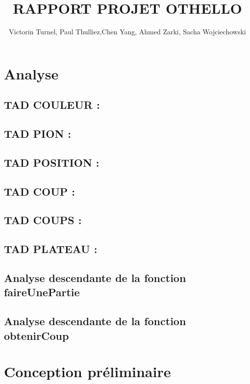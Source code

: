 \documentclass{article}
\title{RAPPORT PROJET OTHELLO}
\author{Victorin Turnel, Paul Thulliez,Chen Yang, Ahmed Zarki, Sacha Wojciechowski}
\begin{document}
\maketitle

\section{Analyse}

\subsection{TAD COULEUR :}


\subsection{TAD PION :}


\subsection{TAD POSITION :}


\subsection{TAD COUP :}


\subsection{TAD COUPS :}


\subsection{TAD PLATEAU :}



\subsection{Analyse descendante de la fonction faireUnePartie}


\subsection{Analyse descendante de la fonction obtenirCoup}

\section{Conception préliminaire}
\end{document}
